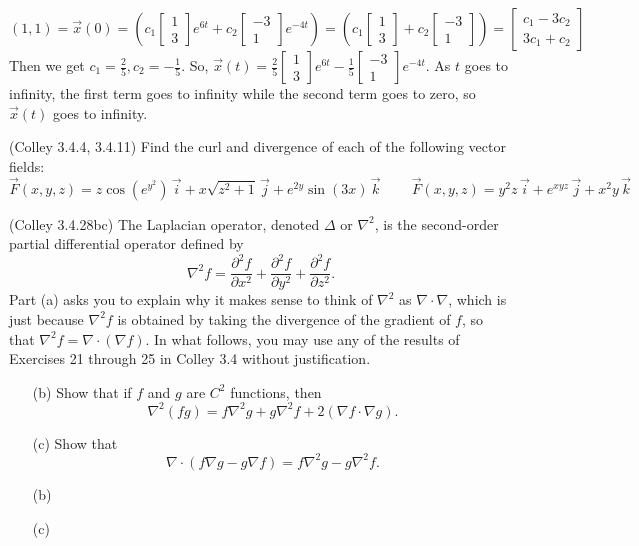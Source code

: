 \documentclass[11pt,letterpaper,cm]{nupset}
\newcommand{\bmat}[1]{\begin{bmatrix} #1 \end{bmatrix}}
\begin{document}
\begin{solution}
\begin{itemize}
			$$(1,1)=\vec{x}(0)=(c_1\bmat{1\\3}e^{6t}+c_2\bmat{-3\\1}e^{-4t})=(c_1\bmat{1\\3}+c_2\bmat{-3\\1})=\bmat{c_1-3c_2\\3c_1+c_2}$$
		Then we get $c_1=\frac{2}{5},c_2=-\frac{1}{5}$. So, $\vec{x}(t)=\frac{2}{5}\bmat{1\\3}e^{6t}-\frac{1}{5}\bmat{-3\\1}e^{-4t}$. As $t$ goes to infinity, the first term goes to infinity while the second term goes to zero, so $\vec{x}(t)$ goes to infinity. 
	\end{itemize}
\end{solution}
\newpage

\begin{problem}[Exercise 8] (Colley 3.4.4, 3.4.11) Find the curl and divergence of each of the following vector fields:
	$$ \vec{F}(x,y,z)=z\cos(e^{y^2})\,\vec{i}+x\sqrt{z^2+1}\,\vec{j}+e^{2y}\sin(3x)\,\vec{k} \qquad \ \vec{F}(x,y,z)=y^2z\,\vec{i}+e^{xyz}\,\vec{j}+x^2y\,\vec{k}$$
\end{problem}
\begin{solution}
\end{solution}
\newpage

\begin{problem}[Exercise 9] (Colley 3.4.28bc) The Laplacian operator, denoted $\Delta$ or $\nabla^2$, is the second-order partial differential operator defined by
	$$\nabla^2f = \frac{\partial^2 f}{\partial x^2}+\frac{\partial^2 f}{\partial y^2}+\frac{\partial^2 f}{\partial z^2}.$$
	Part (a) asks you to explain why it makes sense to think of $\nabla^2$ as $\nabla \cdot \nabla$, which is just because $\nabla^2f$ is obtained by taking the divergence of the gradient of $f$, so that $\nabla^2f = \nabla\cdot(\nabla f)$. In what follows, you may use any of the results of Exercises 21 through 25 in Colley 3.4 without justification.
	\begin{itemize}
		\item[(b)] Show that if $f$ and $g$ are $C^2$ functions, then
		$$\nabla^2(fg) = f\nabla^2g+g\nabla^2f+2(\nabla f\cdot\nabla g).$$
		\item[(c)] Show that
		$$\nabla\cdot(f\nabla g-g\nabla f) = f\nabla^2g-g\nabla^2f.$$
	\end{itemize}
\end{problem}
\begin{solution}
		\begin{itemize}
		\item[(b)]
		\item[(c)]
	\end{itemize}
\end{solution}
\newpage
\end{document}
